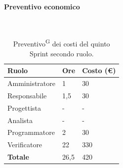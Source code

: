 \documentclass[8pt]{article}
\newcommand{\glossterm}[1]{#1\textsuperscript{G}} %
\newcommand{\subsubsubsection}[1]{\paragraph{#1}\mbox{}\\}
\begin{document}
\subsubsubsection{Preventivo economico}
\begin{table}[ht!]
	\centering
	\begin{tabular}{p{4cm} p{1cm} p{2cm}}
        \toprule
        \textbf{Ruolo} & \textbf{Ore} & \textbf{Costo (€)} \\
        \midrule
        Amministratore & 1 & 30 \\
        Responsabile & 1,5 & 30 \\
        Progettista & - & - \\
        Analista & - & - \\
        Programmatore & 2 & 30 \\
        Verificatore & 22 & 330 \\
        \bottomrule
        \textbf{Totale} & 26,5 & 420
    \end{tabular}
    \caption{\glossterm{Preventivo} dei costi del quinto Sprint secondo ruolo.}
	\label{table:Preventivo dei costi del quinto Sprint secondo ruolo}
\end{table}
\clearpage
\end{document}
